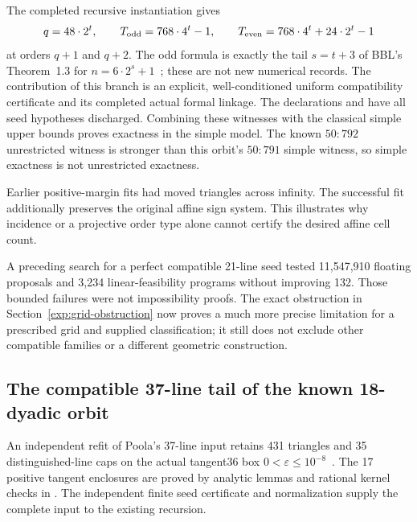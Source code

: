 The completed recursive instantiation gives
\begin{equation}
 q=48\cdot2^t,\qquad T_{\rm odd}=768\cdot4^t-1,
 \qquad T_{\rm even}=768\cdot4^t+24\cdot2^t-1
 \label{fam:49-conditional}
\end{equation}
at orders $q+1$ and $q+2$. The odd formula is exactly the tail $s=t+3$
of BBL's Theorem~1.3 for $n=6\cdot2^s+1$~\cite{bbl2008}; these are
not new numerical records. The contribution of this branch is an
explicit, well-conditioned uniform compatibility certificate and its
completed actual formal linkage. The declarations
 and
have all seed hypotheses discharged. Combining these witnesses with the
classical simple upper bounds proves exactness in the simple model.
The known $50:792$ unrestricted witness is stronger than this orbit's
$50:791$ simple witness, so simple exactness is not unrestricted exactness.

Earlier positive-margin fits had moved triangles across infinity.
The successful fit additionally preserves the original affine sign
system. This illustrates why incidence or a projective order type alone
cannot certify the desired affine cell count.

A preceding search for a perfect compatible 21-line seed tested
11,547,910 floating proposals and 3,234 linear-feasibility programs
without improving 132. Those bounded failures were not impossibility
proofs. The exact obstruction in Section~\ref{exp:grid-obstruction}
now proves a much more precise limitation for a prescribed grid and
supplied classification; it still does not exclude other compatible
families or a different geometric construction.

\subsection{The compatible 37-line tail of the known 18-dyadic orbit}
\label{fam:seed37}

An independent refit of Poola's 37-line input retains 431 triangles and
35 distinguished-line caps on the actual tangent36 box
$0<\varepsilon\le10^{-8}$~\cite{poola2026}. The 17 positive tangent
enclosures are proved by analytic lemmas and rational kernel checks in
. The independent finite seed certificate and
normalization supply the complete input to the existing recursion.

